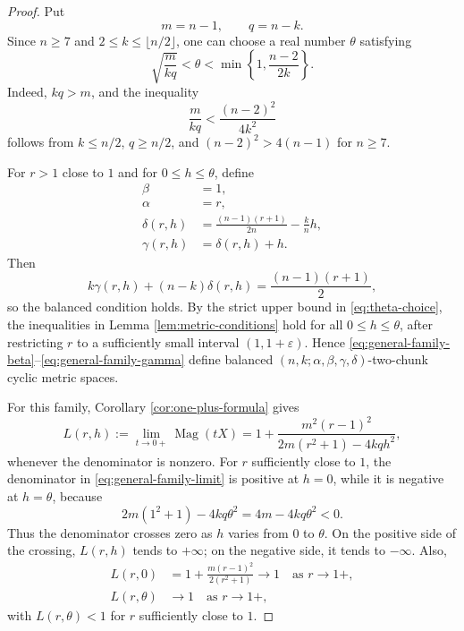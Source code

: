 \documentclass[11pt]{amsart}
\numberwithin{equation}{section}
\theoremstyle{definition}
\theoremstyle{remark}
\DeclareMathOperator{\Mag}{Mag}
\begin{document}
\begin{proof}
Put
\begin{equation}\label{eq:m-q-definition}
m=n-1,
\qquad
q=n-k.
\end{equation}
Since \(n\geq 7\) and \(2\leq k\leq \lfloor n/2\rfloor\), one can choose a real number \(\theta\) satisfying
\begin{equation}\label{eq:theta-choice}
\sqrt{\frac{m}{kq}}<\theta<\min\left\{1,\frac{n-2}{2k}\right\}.
\end{equation}
Indeed, \(kq>m\), and the inequality
\begin{equation}\label{eq:theta-interval-nonempty}
\frac{m}{kq}<\frac{(n-2)^2}{4k^2}
\end{equation}
follows from \(k\leq n/2\), \(q\geq n/2\), and \((n-2)^2>4(n-1)\) for \(n\geq 7\).

For \(r>1\) close to \(1\) and for \(0\leq h\leq \theta\), define
\begin{align}
\beta&=1,
\label{eq:general-family-beta}\\
\alpha&=r,
\label{eq:general-family-alpha}\\
\delta(r,h)&=\frac{(n-1)(r+1)}{2n}-\frac{k}{n}h,
\label{eq:general-family-delta}\\
\gamma(r,h)&=\delta(r,h)+h.
\label{eq:general-family-gamma}
\end{align}
Then
\begin{equation}\label{eq:general-family-balanced}
k\gamma(r,h)+(n-k)\delta(r,h)=\frac{(n-1)(r+1)}{2},
\end{equation}
so the balanced condition holds.  By the strict upper bound in \eqref{eq:theta-choice}, the inequalities in Lemma \ref{lem:metric-conditions} hold for all \(0\leq h\leq\theta\), after restricting \(r\) to a sufficiently small interval \((1,1+\varepsilon)\).  Hence \eqref{eq:general-family-beta}--\eqref{eq:general-family-gamma} define balanced \((n,k;\alpha,\beta,\gamma,\delta)\)-two-chunk cyclic metric spaces.

For this family, Corollary \ref{cor:one-plus-formula} gives
\begin{equation}\label{eq:general-family-limit}
L(r,h)
:=\lim_{t\to 0+}\Mag(tX)
=1+\frac{m^2(r-1)^2}{2m(r^2+1)-4kq h^2},
\end{equation}
whenever the denominator is nonzero.  For \(r\) sufficiently close to \(1\), the denominator in \eqref{eq:general-family-limit} is positive at \(h=0\), while it is negative at \(h=\theta\), because
\begin{equation}\label{eq:general-denominator-signs}
2m(1^2+1)-4kq\theta^2=4m-4kq\theta^2<0.
\end{equation}
Thus the denominator crosses zero as \(h\) varies from \(0\) to \(\theta\).  On the positive side of the crossing, \(L(r,h)\) tends to \(+\infty\); on the negative side, it tends to \(-\infty\).  Also,
\begin{align}
L(r,0)&=1+\frac{m(r-1)^2}{2(r^2+1)}\longrightarrow 1
\quad \text{as } r\to 1+,
\label{eq:general-L-at-zero}\\
L(r,\theta)&\longrightarrow 1
\quad \text{as } r\to 1+,
\label{eq:general-L-at-theta}
\end{align}
with \(L(r,\theta)<1\) for \(r\) sufficiently close to \(1\).


\end{proof}
\end{document}

